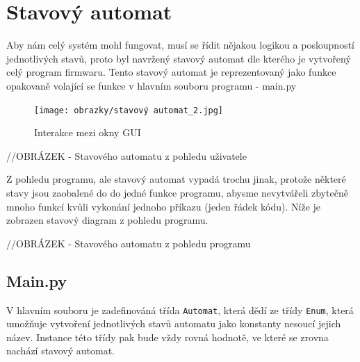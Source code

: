 \section{Stavový automat}
Aby nám celý systém mohl fungovat, musí se řídit nějakou logikou a posloupností jednotlivých stavů, proto byl navržený stavový automat dle kterého je vytvořený celý program firmwaru. Tento stavový automat je reprezentovaný jako funkce opakovaně volající se funkce v hlavním souboru programu - main.py

\begin{figure}[H]
    \begin{center}
        \texttt{[image: obrazky/stavový automat\_2.jpg]}
    \end{center}
    \caption{Interakce mezi okny GUI}
    \label{Interakce mezi okny GUI}
\end{figure}
//OBRÁZEK - Stavového automatu z pohledu uživatele

Z pohledu programu, ale stavový automat vypadá trochu jinak, protože některé stavy jsou zaobalené do do jedné funkce programu, abysme nevytvářeli zbytečně mnoho funkcí kvůli vykonání jednoho příkazu (jeden řádek kódu). Níže je zobrazen stavový diagram z pohledu programu.

//OBRÁZEK - Stavového automatu z pohledu programu

\subsection{Main.py}

V hlavním souboru je zadefinováná třída \texttt{Automat}, která dědí ze třídy \texttt{Enum}, která umožňuje vytvoření jednotlivých stavů automatu jako konstanty nesoucí jejich název. Instance této třídy pak bude vždy rovná hodnotě, ve které se zrovna nachází stavový automat.

%


